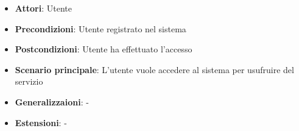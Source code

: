 \begin{itemize}
    \item \textbf{Attori}: Utente
    \item \textbf{Precondizioni}: Utente registrato nel sistema
    \item \textbf{Postcondizioni}: Utente ha effettuato l'accesso
    \item \textbf{Scenario principale}: L'utente vuole accedere al sistema per usufruire del servizio
    \item \textbf{Generalizzaioni}: -
    \item \textbf{Estensioni}: -
\end{itemize}